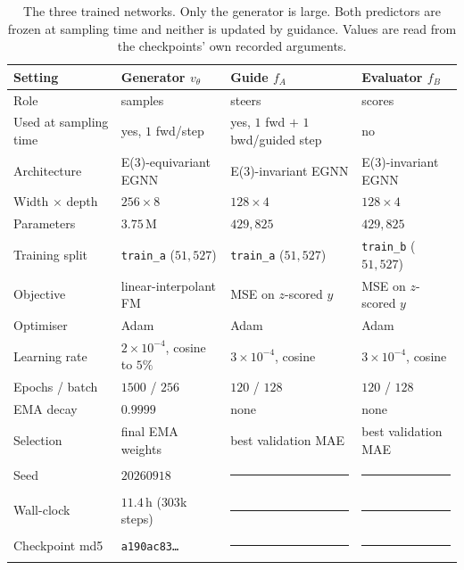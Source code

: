 \documentclass{article}
\newif\ifDRAFT \DRAFTtrue
\newcommand{\pend}{\ifDRAFT\textcolor{pendcol}{\rule[0.28ex]{1.15em}{0.6pt}}%
                   \else\phantom{0.0000}\fi}
\begin{document}
\begin{table}[h]
\centering\small
\caption{The three trained networks. Only the generator is large. Both predictors
are frozen at sampling time and neither is updated by guidance. Values are read
from the checkpoints' own recorded arguments.}
\label{tab:a-train}
\setlength{\tabcolsep}{4pt}
\begin{tabular}{llll}
\toprule
Setting & Generator $v_\theta$ & Guide $f_A$ & Evaluator $f_B$ \\
\midrule
Role                  & samples             & steers              & scores \\
Used at sampling time & yes, $1$ fwd/step   & yes, $1$ fwd $+$ $1$ bwd/guided step & no \\
Architecture          & E(3)-equivariant EGNN & E(3)-invariant EGNN & E(3)-invariant EGNN \\
Width $\times$ depth  & $256\times8$        & $128\times4$        & $128\times4$ \\
Parameters            & $3.75$\,M           & $429{,}825$         & $429{,}825$ \\
Training split        & \texttt{train\_a} ($51{,}527$) & \texttt{train\_a} ($51{,}527$) & \texttt{train\_b} ($51{,}527$) \\
Objective             & linear-interpolant FM & MSE on $z$-scored $y$ & MSE on $z$-scored $y$ \\
Optimiser             & Adam                & Adam                & Adam \\
Learning rate         & $2\times10^{-4}$, cosine to $5\%$ & $3\times10^{-4}$, cosine & $3\times10^{-4}$, cosine \\
Epochs / batch        & $1500$ / $256$      & $120$ / $128$       & $120$ / $128$ \\
EMA decay             & $0.9999$            & none                & none \\
Selection             & final EMA weights   & best validation MAE & best validation MAE \\
Seed                  & $20260918$          & \pend               & \pend \\
Wall-clock            & $11.4$\,h ($303$k steps) & \pend          & \pend \\
Checkpoint md5        & \texttt{a190ac83\ldots} & \pend           & \pend \\
\bottomrule
\end{tabular}
\end{table}
\end{document}
